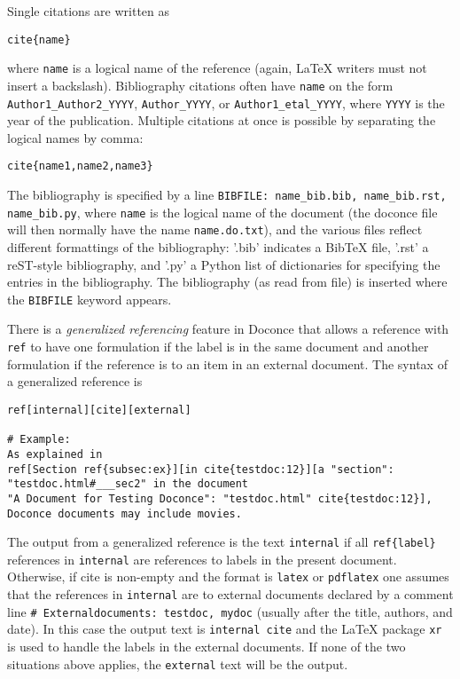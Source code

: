 \documentclass[%
oneside,                 %
final,                   %
10pt]{article}
\begin{document}
Single citations are written as
\begin{Verbatim}[numbers=none,fontsize=\fontsize{9pt}{9pt},baselinestretch=0.85,xleftmargin=0mm]
cite{name}
\end{Verbatim}
where \Verb!name! is a logical name
of the reference (again, {\LaTeX} writers must not insert a backslash).
Bibliography citations often have \Verb!name! on the form
\Verb!Author1_Author2_YYYY!, \Verb!Author_YYYY!, or \Verb!Author1_etal_YYYY!, where
\Verb!YYYY! is the year of the publication.
Multiple citations at once is possible by separating the logical names
by comma:
\begin{Verbatim}[numbers=none,fontsize=\fontsize{9pt}{9pt},baselinestretch=0.85,xleftmargin=0mm]
cite{name1,name2,name3}
\end{Verbatim}

The bibliography is specified by a line \Verb!BIBFILE: name_bib.bib, name_bib.rst, name_bib.py!, where \Verb!name! is the logical name of the
document (the doconce file will then normally have the name
\Verb!name.do.txt!), and the various files reflect different formattings of
the bibliography: '.bib' indicates a BibTeX file, '.rst' a reST-style
bibliography, and '.py' a Python list of dictionaries for specifying
the entries in the bibliography. The bibliography (as read from file)
is inserted where the \Verb!BIBFILE! keyword appears.

There is a \emph{generalized referencing} feature in Doconce that allows
a reference with \Verb!ref! to have one formulation if the label is
in the same document and another formulation if the reference is
to an item in an external document. The syntax of a generalized
reference is
\begin{Verbatim}[numbers=none,fontsize=\fontsize{9pt}{9pt},baselinestretch=0.85,xleftmargin=0mm]
ref[internal][cite][external]

# Example:
As explained in
ref[Section ref{subsec:ex}][in cite{testdoc:12}][a "section":
"testdoc.html#___sec2" in the document
"A Document for Testing Doconce": "testdoc.html" cite{testdoc:12}],
Doconce documents may include movies.
\end{Verbatim}
The output from a generalized reference is the text \Verb!internal! if all
\Verb!ref{label}! references in \Verb!internal! are references to labels in the
present document. Otherwise, if cite is non-empty and the format is
\Verb!latex! or \Verb!pdflatex! one assumes that the references in \Verb!internal!
are to external documents declared by a comment line \Verb!# Externaldocuments: testdoc, mydoc! (usually after the title, authors,
and date). In this case the output text is \Verb!internal cite! and the
{\LaTeX} package \Verb!xr! is used to handle the labels in the external
documents.  If none of the two situations above applies, the
\Verb!external! text will be the output.
\end{document}

